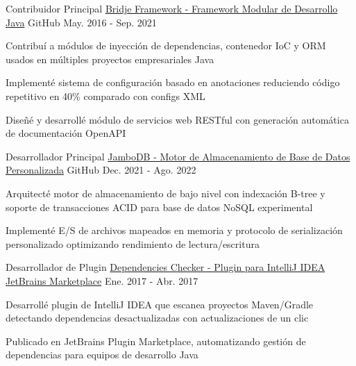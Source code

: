 \begin{cventries}
  \cventry
    {Contribuidor Principal} %
    {\href{https://github.com/touwolf/bridje-framework}{Bridje Framework - Framework Modular de Desarrollo Java}} %
    {\faGithubSquare\acvHeaderIconSep GitHub} %
    {May. 2016 - Sep. 2021} %
    {
      \begin{cvitems} %
        \item {Contribuí a módulos de inyección de dependencias, contenedor IoC y ORM usados en múltiples proyectos empresariales Java}
        \item {Implementé sistema de configuración basado en anotaciones reduciendo código repetitivo en 40\% comparado con configs XML}
        \item {Diseñé y desarrollé módulo de servicios web RESTful con generación automática de documentación OpenAPI}
      \end{cvitems}
    }

  \cventry
    {Desarrollador Principal} %
    {\href{https://github.com/jambodb/jambodb-storage}{JamboDB - Motor de Almacenamiento de Base de Datos Personalizada}} %
    {\faGithubSquare\acvHeaderIconSep GitHub} %
    {Dec. 2021 - Ago. 2022} %
    {
      \begin{cvitems} %
        \item {Arquitecté motor de almacenamiento de bajo nivel con indexación B-tree y soporte de transacciones ACID para base de datos NoSQL experimental}
        \item {Implementé E/S de archivos mapeados en memoria y protocolo de serialización personalizado optimizando rendimiento de lectura/escritura}
      \end{cvitems}
    }

  \cventry
    {Desarrollador de Plugin} %
    {\href{https://github.com/zp1ke/deps-checker}{Dependencies Checker - Plugin para IntelliJ IDEA}} %
    {\href{https://plugins.jetbrains.com/plugin/9481-java-dependencies-checker}{JetBrains Marketplace}} %
    {Ene. 2017 - Abr. 2017} %
    {
      \begin{cvitems} %
        \item {Desarrollé plugin de IntelliJ IDEA que escanea proyectos Maven/Gradle detectando dependencias desactualizadas con actualizaciones de un clic}
        \item {Publicado en JetBrains Plugin Marketplace, automatizando gestión de dependencias para equipos de desarrollo Java}
      \end{cvitems}
    }


\end{cventries}
